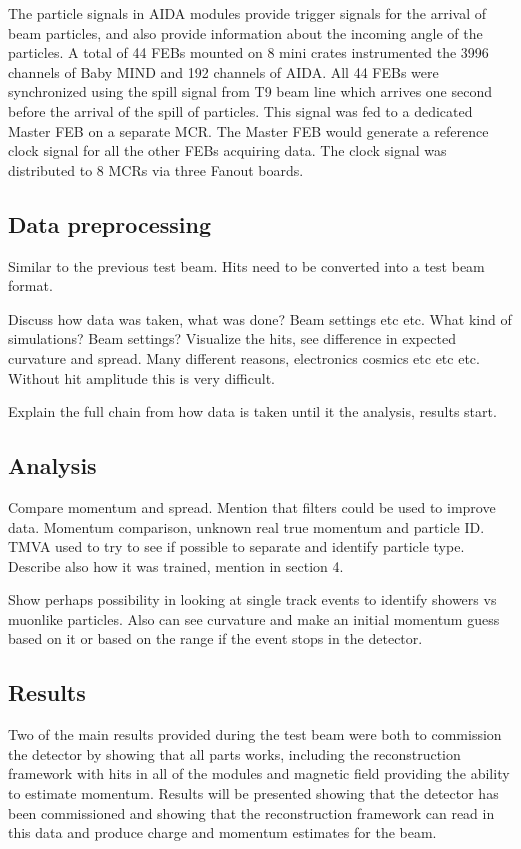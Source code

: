  The particle signals in AIDA modules provide trigger signals for the arrival of beam particles, and also provide information about the incoming angle of the particles. A total of 44 FEBs mounted on 8 mini crates instrumented the 3996 channels of Baby MIND and 192 channels of AIDA.
All 44 FEBs were synchronized using the spill signal from T9 beam line which arrives one second before the arrival of the spill of particles. This signal was fed to a dedicated Master FEB on a separate MCR. The Master FEB would generate a reference clock signal for all the other FEBs acquiring data. The clock signal was distributed to 8 MCRs via three Fanout boards.

\subsection{Data preprocessing}
Similar to the previous test beam. Hits need to be converted into a test beam format.

Discuss how data was taken, what was done? Beam settings etc etc. What kind of simulations? Beam settings? Visualize the hits, see difference in expected curvature and spread. Many different reasons, electronics cosmics etc etc etc. Without hit amplitude this is very difficult.

Explain the full chain from how data is taken until it the analysis, results start.


\subsection{Analysis}

Compare momentum and spread. Mention that filters could be used to improve data. Momentum comparison, unknown real true momentum and particle ID. TMVA used to try to see if possible to separate and identify particle type. Describe also how it was trained, mention in section 4.

Show perhaps possibility in looking at single track events to identify showers vs muonlike particles. Also can see curvature and make an initial momentum guess based on it or based on the range if the event stops in the detector.


\subsection{Results}
Two of the main results provided during the test beam were both to commission the detector by showing that all parts works, including the reconstruction framework with hits in all of the modules and magnetic field providing the ability to estimate momentum. Results will be presented showing that the detector has been commissioned and showing that the reconstruction framework can read in this data and produce charge and momentum estimates for the beam.

